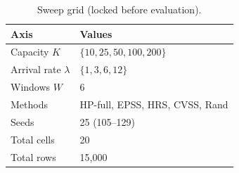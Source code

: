 \begin{table}[!t]
  \caption{Sweep grid (locked before evaluation).}
  \label{tab:grid}
  \centering
  \small
  \setlength{\tabcolsep}{4pt}
  \begin{tabular}{@{}p{3.0cm}p{4.7cm}@{}}
    \toprule
    \textbf{Axis} & \textbf{Values} \\
    \midrule
    Capacity $K$ & $\{10, 25, 50, 100, 200\}$ \\
    Arrival rate $\lambda$ & $\{1, 3, 6, 12\}$ \\
    Windows $W$ & 6 \\
    Methods & HP-full, EPSS, HRS, CVSS, Rand \\
    Seeds & 25 (105--129) \\
    \midrule
    Total cells & 20 \\
    Total rows & 15{,}000 \\
    \bottomrule
  \end{tabular}
\end{table}
